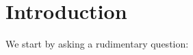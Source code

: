 \documentclass[12pt]{article}
\begin{document}
\begin{comment}
\section*{Preliminary Questions and Ideas of Steffen}
\begin{remark}So far I have been reading the following five papers: \cite{ALM99,AM99,H03,LMPX08,M00}.  Put together they give a nice overview of the theory.  At this first glance, I'm having trouble understanding exactly why the theory necessitates a survey paper like the one we are proposing, although I do see that the exposition so far is a bit disjointed.  I think our reader will be best served by a paper that includes a TON of examples (it seems, Paul, you agrees with this given the way you've started writing), and motivates not only the theory for theory's sake, but how the reader may be able to use regular chains to better their research (and life).
\end{remark}

\begin{remark} A first attempt at an outline might be something like the following:
\begin{enumerate}
\item Introduction - statement of questions being addressed, one or two examples, a brief history of the theory
\item First examples - one or two long drawn out examples describing some interesting varieties using both Kalkbrenner and Larard decompositions and explaining the intricacies as the examples go.
\item Commutative algebra - go through necessary pre-req's
\item Regular Chains - go through theory of triangular sets and regular chains.  
\item Maybe a section on the notion of a Primitive regular chain
\item Triangular Decompositions
\item Other applications
\end{enumerate}
\end{remark}
\end{comment}


\section{Introduction}
We start by asking a rudimentary question:
\end{document}
